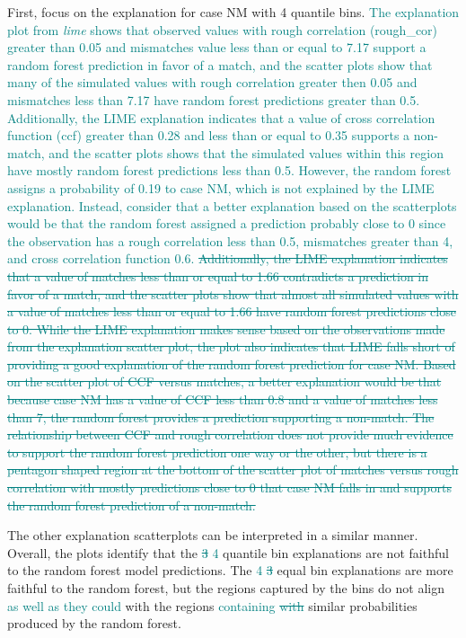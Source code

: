 \documentclass[AMS,STIX2COL]{WileyNJD-v2}\usepackage[]{graphicx}\usepackage[]{color}
\newcommand{\kge}[1]{\textcolor{teal}{#1}}
\begin{document}
First, focus on the explanation for case NM with 4 quantile bins. \kge{The explanation plot from \emph{lime} shows that observed values with rough correlation (rough\_cor) greater than 0.05 and mismatches value less than or equal to 7.17 support a random forest prediction in favor of a match, and the scatter plots show that many of the simulated values with rough correlation greater then 0.05 and mismatches less than 7.17 have random forest predictions greater than 0.5. Additionally, the LIME explanation indicates that a value of cross correlation function (ccf) greater than 0.28 and less than or equal to 0.35 supports a non-match, and the scatter plots shows that the simulated values within this region have mostly random forest predictions less than 0.5.  However, the random forest assigns a probability of 0.19 to case NM, which is not explained by the LIME explanation. Instead, consider that a better explanation based on the scatterplots would be that the random forest assigned a prediction probably close to 0 since the observation has a rough correlation less than 0.5, mismatches greater than 4, and cross correlation function 0.6.} \kge{\sout{Additionally, the LIME explanation indicates that a value of matches less than or equal to 1.66 contradicts a prediction in favor of a match, and the scatter plots show that almost all simulated values with a value of matches less than or equal to 1.66 have random forest predictions close to 0. While the LIME explanation makes sense based on the observations made from the explanation scatter plot, the plot also indicates that LIME falls short of providing a good explanation of the random forest prediction for case NM. Based on the scatter plot of CCF versus matches, a better explanation would be that because case NM has a value of CCF less than 0.8 and a value of matches less than 7, the random forest provides a prediction supporting a non-match. The relationship between CCF and rough correlation does not provide much evidence to support the random forest prediction one way or the other, but there is a pentagon shaped region at the bottom of the scatter plot of matches versus rough correlation with mostly predictions close to 0 that case NM falls in and supports the random forest prediction of a non-match.}}

The other explanation scatterplots can be interpreted in a similar manner. Overall, the plots identify that the \kge{\sout{3} 4} quantile bin explanations are not faithful to the random forest model predictions. The \kge{4 \sout{3}} equal bin explanations are more faithful to the random forest, but the regions captured by the bins do not align \kge{as well as they could} with the regions \kge{containing \sout{with}} similar probabilities produced by the random forest.
\end{document}
